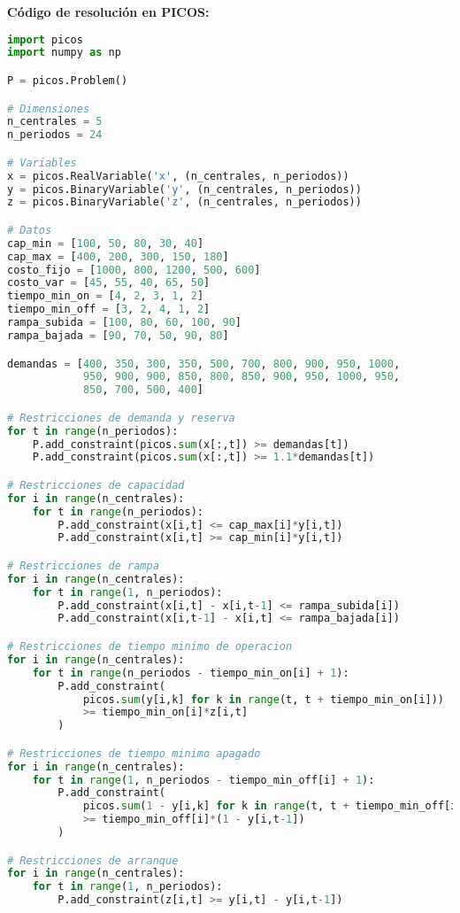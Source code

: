 \documentclass[12pt]{article}
\begin{document}
\begin{enumerate}
\textbf{Código de resolución en PICOS:}
\begin{lstlisting}[language=Python]
import picos
import numpy as np

P = picos.Problem()

# Dimensiones
n_centrales = 5
n_periodos = 24

# Variables
x = picos.RealVariable('x', (n_centrales, n_periodos))
y = picos.BinaryVariable('y', (n_centrales, n_periodos))
z = picos.BinaryVariable('z', (n_centrales, n_periodos))

# Datos
cap_min = [100, 50, 80, 30, 40]
cap_max = [400, 200, 300, 150, 180]
costo_fijo = [1000, 800, 1200, 500, 600]
costo_var = [45, 55, 40, 65, 50]
tiempo_min_on = [4, 2, 3, 1, 2]
tiempo_min_off = [3, 2, 4, 1, 2]
rampa_subida = [100, 80, 60, 100, 90]
rampa_bajada = [90, 70, 50, 90, 80]

demandas = [400, 350, 300, 350, 500, 700, 800, 900, 950, 1000, 
            950, 900, 900, 850, 800, 850, 900, 950, 1000, 950, 
            850, 700, 500, 400]

# Restricciones de demanda y reserva
for t in range(n_periodos):
    P.add_constraint(picos.sum(x[:,t]) >= demandas[t])
    P.add_constraint(picos.sum(x[:,t]) >= 1.1*demandas[t])

# Restricciones de capacidad
for i in range(n_centrales):
    for t in range(n_periodos):
        P.add_constraint(x[i,t] <= cap_max[i]*y[i,t])
        P.add_constraint(x[i,t] >= cap_min[i]*y[i,t])

# Restricciones de rampa
for i in range(n_centrales):
    for t in range(1, n_periodos):
        P.add_constraint(x[i,t] - x[i,t-1] <= rampa_subida[i])
        P.add_constraint(x[i,t-1] - x[i,t] <= rampa_bajada[i])

# Restricciones de tiempo minimo de operacion
for i in range(n_centrales):
    for t in range(n_periodos - tiempo_min_on[i] + 1):
        P.add_constraint(
            picos.sum(y[i,k] for k in range(t, t + tiempo_min_on[i]))
            >= tiempo_min_on[i]*z[i,t]
        )

# Restricciones de tiempo minimo apagado
for i in range(n_centrales):
    for t in range(1, n_periodos - tiempo_min_off[i] + 1):
        P.add_constraint(
            picos.sum(1 - y[i,k] for k in range(t, t + tiempo_min_off[i]))
            >= tiempo_min_off[i]*(1 - y[i,t-1])
        )

# Restricciones de arranque
for i in range(n_centrales):
    for t in range(1, n_periodos):
        P.add_constraint(z[i,t] >= y[i,t] - y[i,t-1])


\end{lstlisting}
\end{enumerate}
\end{document}
